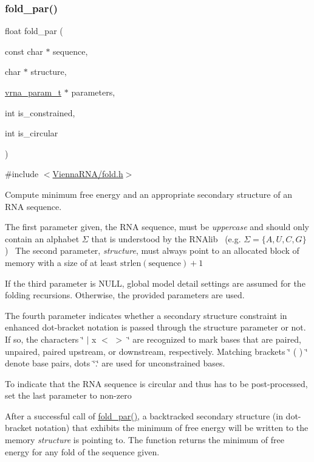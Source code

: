 \subsubsection{\texorpdfstring{fold\+\_\+par()}{fold\_par()}}
{\footnotesize\ttfamily float fold\+\_\+par (\begin{DoxyParamCaption}\item[{const char $\ast$}]{sequence,  }\item[{char $\ast$}]{structure,  }\item[{\hyperlink{group__energy__parameters_ga8a69ca7d787e4fd6079914f5343a1f35}{vrna\+\_\+param\+\_\+t} $\ast$}]{parameters,  }\item[{int}]{is\+\_\+constrained,  }\item[{int}]{is\+\_\+circular }\end{DoxyParamCaption})}



{\ttfamily \#include $<$\hyperlink{fold_8h}{Vienna\+R\+N\+A/fold.\+h}$>$}



Compute minimum free energy and an appropriate secondary structure of an R\+NA sequence. 

The first parameter given, the R\+NA sequence, must be {\itshape uppercase} and should only contain an alphabet $\Sigma$ that is understood by the R\+N\+Alib~\newline
(e.\+g. $ \Sigma = \{A,U,C,G\} $)~\newline
 The second parameter, {\itshape structure}, must always point to an allocated block of memory with a size of at least $\mathrm{strlen}(\mathrm{sequence})+1$

If the third parameter is N\+U\+LL, global model detail settings are assumed for the folding recursions. Otherwise, the provided parameters are used.

The fourth parameter indicates whether a secondary structure constraint in enhanced dot-\/bracket notation is passed through the structure parameter or not. If so, the characters \char`\"{} $\vert$ x $<$ $>$ \char`\"{} are recognized to mark bases that are paired, unpaired, paired upstream, or downstream, respectively. Matching brackets \char`\"{} ( ) \char`\"{} denote base pairs, dots \char`\"{}.\char`\"{} are used for unconstrained bases.

To indicate that the R\+NA sequence is circular and thus has to be post-\/processed, set the last parameter to non-\/zero

After a successful call of \hyperlink{group__mfe__global__deprecated_ga2bc41df5d71fee6fd8da9904ee65d8fb}{fold\+\_\+par()}, a backtracked secondary structure (in dot-\/bracket notation) that exhibits the minimum of free energy will be written to the memory {\itshape structure} is pointing to. The function returns the minimum of free energy for any fold of the sequence given.

